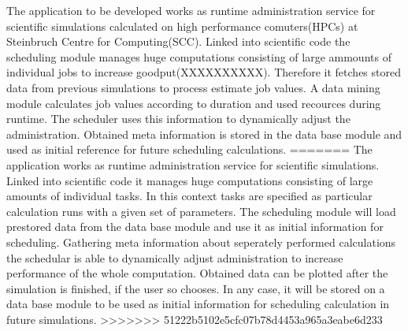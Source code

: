The application to be developed works as runtime administration service for scientific simulations calculated on high performance comuters(HPCs) at Steinbruch Centre for Computing(SCC). Linked into scientific code the scheduling module manages huge computations consisting of large ammounts of individual jobs to increase goodput(XXXXXXXXXX). Therefore it fetches stored data from previous simulations to process estimate job values. A data mining module calculates job values according to duration and used recources during runtime. The scheduler uses this information to dynamically adjust the administration. Obtained meta information is stored in the data base module and used as initial reference for future scheduling calculations.
=======
The application works as runtime administration service for scientific simulations. Linked into scientific code it manages huge computations consisting of large amounts of individual tasks. In this context tasks are specified as particular calculation runs with a given set of parameters. The scheduling module will load prestored data from the data base module and use it as initial information for scheduling. Gathering meta information about seperately performed calculations the schedular is able to dynamically adjust administration to increase performance of the whole computation. Obtained data can be plotted after the simulation is finished, if the user so chooses. In any case, it will be stored on a data base module to be used as initial information for scheduling calculation in future simulations. 
>>>>>>> 51222b5102e5cfc07b78d4453a965a3eabe6d233
